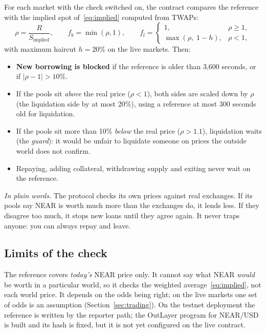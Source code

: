 \documentclass[11pt,a4paper]{article}
\newcommand{\inwords}[1]{\par\noindent\colorbox{note}{\parbox{\dimexpr\linewidth-2\fboxsep}{\small\textit{In plain words.} #1}}\par}
\begin{document}
For each market with the check switched on, the contract compares the reference with the implied spot
of~\eqref{eq:implied} computed from TWAPs:
\begin{equation}
  \rho = \frac{R}{S_{\text{implied}}}, \qquad
  f_b = \min(\rho, 1), \qquad
  f_l = \begin{cases} 1, & \rho \ge 1,\\ \max(\rho,\; 1 - h), & \rho < 1, \end{cases}
  \label{eq:rho}
\end{equation}
with maximum haircut $h = 20\%$ on the live markets. Then:
\begin{itemize}
\item \textbf{New borrowing is blocked} if the reference is older than 3,600 seconds, or if $|\rho - 1| > 10\%$.
\item If the pools sit \emph{above} the real price ($\rho<1$), both sides are scaled down by $\rho$ (the
liquidation side by at most 20\%), using a reference at most 300 seconds old for liquidation.
\item If the pools sit more than 10\% \emph{below} the real price ($\rho > 1.1$), liquidation waits (the
\emph{guard}): it would be unfair to liquidate someone on prices the outside world does not confirm.
\item Repaying, adding collateral, withdrawing supply and exiting never wait on the reference.
\end{itemize}
\inwords{The protocol checks its own prices against real exchanges. If its pools say NEAR is worth much more than
the exchanges do, it lends less. If they disagree too much, it stops new loans until they agree again. It never
traps anyone: you can always repay and leave.}

\subsection{Limits of the check}

The reference covers \emph{today's} NEAR price only. It cannot say what NEAR \emph{would} be worth in a particular
world, so it checks the weighted average~\eqref{eq:implied}, not each world price. It depends on the odds being
right; on the live markets one set of odds is an assumption (Section~\ref{sec:trading}). On the testnet deployment the
reference is written by the reporter path; the OutLayer program for NEAR/USD is built and its hash is fixed, but it
is not yet configured on the live contract.

\end{document}
